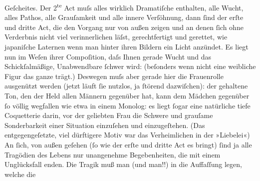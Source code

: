 \begin{ledgroupsized}[t]{13cm}
               Geſcheites.\pend
           \pstart
           {\pb}Der 2\textsuperscript{te}{ }Act muſs alles wirklich
               Dramatiſche enthalten, alle Wucht, alles Pathos, alle Grauſamkeit und alle innere Verſöhnung, dann ſind der erſte und dritte
               Act, die den Vorgang nur von außen zeigen und an denen ſich ohne Verderbnis nicht
               viel verinnerlichen läſst, gerechtfertigt und gerettet, wie japaniſche Laternen wenn man hinter ihren Bildern ein Licht
               anzündet. Es liegt {\pb}nun im Weſen
               ihrer Compoſition, daſs Ihnen gerade Wucht und das Schickſalmäßige, Unabwendbare
               ſchwer wird: (beſonders wenn nicht eine weibliche Figur das ganze trägt.) Deswegen
               muſs aber gerade hier die Frauenrolle ausgenützt werden (jetzt läuft ſie nutzlos, ja
               ſtörend dazwiſchen): der gehaltene Ton, den der Held allen Männern gegenüber hat,
               kann dem Mädchen gegenüber ſo völlig wegfallen wie etwa in einem Monolog: es liegt
               ſogar eine natürliche tiefe Coquetterie darin, {\pb}vor der geliebten Frau die Schwere
               und grauſame Sonderbarkeit einer Situation einzuſehen und einzugeſtehen. (Das
               entgegengeſetzte, viel dürftigere Motiv war das Verheimlichen in der »Liebelei«)\pend
           \pstart
           An ſich, von außen geſehen (ſo wie der erſte und dritte Act es bringt) ſind ja alle Tragödien des Lebens nur unangenehme
               Begebenheiten, die mit einem Unglücksfall enden. Die Tragik muß man (und  man!!) in die Auffaſſung legen, welche die

\end{ledgroupsized}
